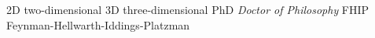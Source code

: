                      {2D}    {two-dimensional}
                     {3D}    {three-dimensional}
   {PhD}   {\emph{Doctor of Philosophy}}
  {FHIP}  {Feynman-Hellwarth-Iddings-Platzman}

